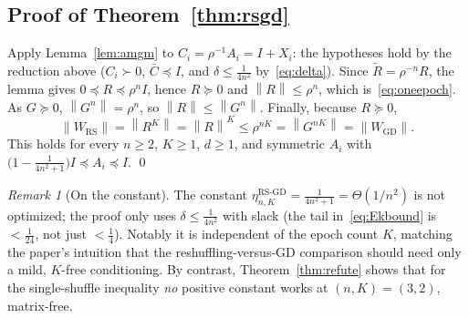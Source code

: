 \documentclass[11pt]{article}
\theoremstyle{definition}
\theoremstyle{remark}
\newtheorem{remark}[theorem]{Remark}
\newcommand{\norm}[1]{\left\lVert #1 \right\rVert}
\newcommand{\Wrs}{W_{\mathrm{RS}}}
\newcommand{\Wgd}{W_{\mathrm{GD}}}
\newcommand{\psdle}{\preceq}
\newcommand{\psdge}{\succeq}
\begin{document}
\subsection{Proof of Theorem~\ref{thm:rsgd}}

Apply Lemma~\ref{lem:amgm} to $C_i=\rho^{-1}A_i=I+X_i$: the hypotheses hold by the reduction above
($C_i\succ0$, $\bar C\psdle I$, and $\delta\le\frac1{4n^2}$ by~\eqref{eq:delta}). Since
$\widetilde R=\rho^{-n}R$, the lemma gives $0\psdle R\psdle\rho^nI$, hence $R\psdge0$ and
$\norm{R}\le\rho^n$, which is~\eqref{eq:oneepoch}. As $G\psdge0$, $\norm{G^n}=\rho^n$, so
$\norm{R}\le\norm{G^n}$. Finally, because $R\psdge0$,
\[
\norm{\Wrs}=\norm{R^K}=\norm{R}^K\le\rho^{nK}=\norm{G^{nK}}=\norm{\Wgd}.
\]
This holds for every $n\ge2$, $K\ge1$, $d\ge1$, and symmetric $A_i$ with
$\bigl(1-\frac1{4n^2+1}\bigr)I\psdle A_i\psdle I$. \qed

\begin{remark}[On the constant]
The constant $\eta^{\mathrm{RS\text{-}GD}}_{n,K}=\frac1{4n^2+1}=\Theta(1/n^2)$ is not optimized; the
proof only uses $\delta\le\frac1{4n^2}$ with slack (the tail in~\eqref{eq:Ekbound} is $<\frac1{24}$,
not just $<\frac14$). Notably it is independent of the epoch count $K$, matching the paper's intuition
that the reshuffling-versus-GD comparison should need only a mild, $K$-free conditioning. By contrast,
Theorem~\ref{thm:refute} shows that for the single-shuffle inequality \emph{no} positive constant
works at $(n,K)=(3,2)$, matrix-free.
\end{remark}
\end{document}
